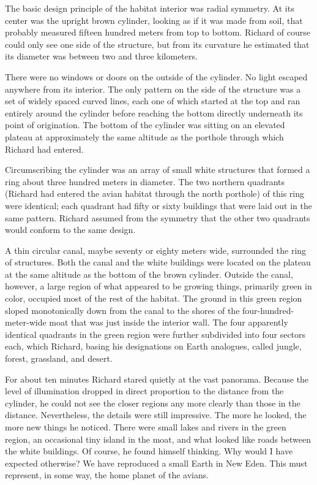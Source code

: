 \documentclass[]{article}
\begin{document}
{The basic design principle of the habitat interior was radial symmetry.  At its center was the upright brown cylinder, looking as if it was made from soil, that probably measured fifteen hundred meters from top to bottom.  Richard of course could only see one side of the structure, but from its curvature he estimated that its diameter was between two and three kilometers.

There were no windows or doors on the outside of the cylinder.  No light escaped anywhere from its interior.  The only pattern on the side of the structure was a set of widely spaced curved lines, each one of which started at the top and ran entirely around the cylinder before reaching the bottom directly underneath its point of origination.  The bottom of the cylinder was sitting on an elevated plateau at approximately the same altitude as the porthole through which Richard had entered.

Circumscribing the cylinder was an array of small white structures that formed a ring about three hundred meters in diameter.  The two northern quadrants (Richard had entered the avian habitat through the north porthole) of this ring were identical; each quadrant had fifty or sixty buildings that were laid out in the same pattern.  Richard assumed from the symmetry that the other two quadrants would conform to the same design.

A thin circular canal, maybe seventy or eighty meters wide, surrounded the ring of structures.  Both the canal and the white buildings were located on the plateau at the same altitude as the bottom of the brown cylinder.  Outside the canal, however, a large region of what appeared to be growing things, primarily green in color, occupied most of the rest of the habitat.  The ground in this green region sloped monotonically down from the canal to the shores of the four-hundred-meter-wide moat that was just inside the interior wall.  The four apparently identical quadrants in the green region were further subdivided into four sectors each, which Richard, basing his designations on Earth analogues, called jungle, forest, grassland, and desert.

For about ten minutes Richard stared quietly at the vast panorama.  Because the level of illumination dropped in direct proportion to the distance from the cylinder, he could not see the closer regions any more clearly than those in the distance.  Nevertheless, the details were still impressive.  The more he looked, the more new things he noticed.  There were small lakes and rivers in the green region, an occasional tiny island in the moat, and what looked like roads between the white buildings.  Of course, he found himself thinking.  Why would I have expected otherwise? We have reproduced a small Earth in New Eden.  This must represent, in some way, the home planet of the avians.

}
\end{document}
